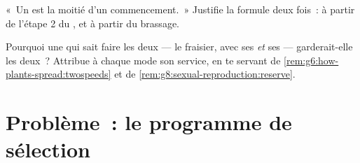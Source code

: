 \begin{exercise}[$\star\star$]\label{exo:g8:sexual-reproduction:11}
«~Un  est la moitié d'un commencement.~» Justifie la formule
deux fois~: à partir de l'étape 2 du , et à partir du brassage.
\end{exercise}

\begin{exercise}[$\star\star\star$]\label{exo:g8:sexual-reproduction:12}
Pourquoi une  qui sait faire les deux --- le fraisier, avec
ses  \emph{et} ses  --- garderait-elle les deux~?
Attribue à chaque mode son service, en te servant de
\cref{rem:g6:how-plants-spread:twospeeds} et de
\cref{rem:g8:sexual-reproduction:reserve}.
\end{exercise}

\section{Problème~: le programme de sélection}

